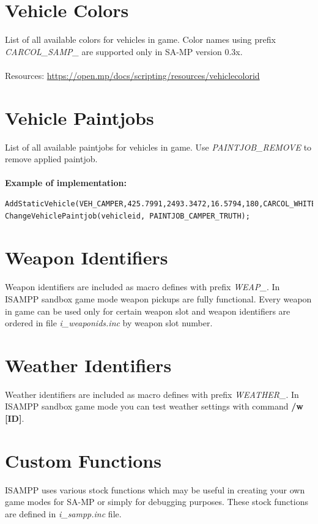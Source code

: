 \documentclass{article}
\begin{document}
\section{Vehicle Colors}
List of all available colors for vehicles in game. Color names using prefix \textit{CARCOL\_SAMP\_} are supported only in SA-MP version 0.3x.
\\
\\Resources: \url{https://open.mp/docs/scripting/resources/vehiclecolorid}

\section{Vehicle Paintjobs}
List of all available paintjobs for vehicles in game. Use \textit{PAINTJOB\_REMOVE} to remove applied paintjob.
\\
\\
\textbf{Example of implementation:}
\begin{verbatim}
AddStaticVehicle(VEH_CAMPER,425.7991,2493.3472,16.5794,180,CARCOL_WHITE,CARCOL_WHITE);
ChangeVehiclePaintjob(vehicleid, PAINTJOB_CAMPER_TRUTH);
\end{verbatim}

\section{Weapon Identifiers}
Weapon identifiers are included as macro defines with prefix \textit{WEAP\_}. In ISAMPP sandbox game mode weapon pickups are fully functional. Every weapon in game can be used only for certain weapon slot and weapon identifiers are ordered in file \textit{i\_weaponids.inc} by weapon slot number.

\section{Weather Identifiers}
Weather identifiers are included as macro defines with prefix \textit{WEATHER\_}. In ISAMPP sandbox game mode you can test weather settings with command \textbf{/w [ID]}.


\newpage
\section{Custom Functions}

ISAMPP uses various stock functions which may be useful in creating your own game modes for SA-MP or simply for debugging purposes. These stock functions are defined in \textit{i\_sampp.inc} file.
\\
\end{document}

